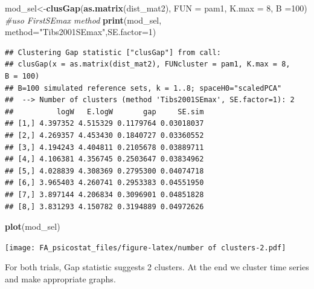 \documentclass[]{article}
\newenvironment{Shaded}{\begin{snugshade}}{\end{snugshade}}
\newcommand{\CommentTok}[1]{\textcolor[rgb]{0.56,0.35,0.01}{\textit{#1}}}
\newcommand{\DataTypeTok}[1]{\textcolor[rgb]{0.13,0.29,0.53}{#1}}
\newcommand{\DecValTok}[1]{\textcolor[rgb]{0.00,0.00,0.81}{#1}}
\newcommand{\KeywordTok}[1]{\textcolor[rgb]{0.13,0.29,0.53}{\textbf{#1}}}
\newcommand{\NormalTok}[1]{#1}
\newcommand{\OperatorTok}[1]{\textcolor[rgb]{0.81,0.36,0.00}{\textbf{#1}}}
\newcommand{\StringTok}[1]{\textcolor[rgb]{0.31,0.60,0.02}{#1}}
\begin{document}
\begin{Shaded}
\begin{Highlighting}[]
\NormalTok{mod_sel<-}\KeywordTok{clusGap}\NormalTok{(}\KeywordTok{as.matrix}\NormalTok{(dist_mat2), }\DataTypeTok{FUN =}\NormalTok{ pam1, }\DataTypeTok{K.max =} \DecValTok{8}\NormalTok{, }\DataTypeTok{B =}\DecValTok{100}\NormalTok{)}
\CommentTok{#uso FirstSEmax method}
\KeywordTok{print}\NormalTok{(mod_sel, }\DataTypeTok{method=}\StringTok{"Tibs2001SEmax"}\NormalTok{,}\DataTypeTok{SE.factor=}\DecValTok{1}\NormalTok{)}
\end{Highlighting}
\end{Shaded}

\begin{verbatim}
## Clustering Gap statistic ["clusGap"] from call:
## clusGap(x = as.matrix(dist_mat2), FUNcluster = pam1, K.max = 8,     B = 100)
## B=100 simulated reference sets, k = 1..8; spaceH0="scaledPCA"
##  --> Number of clusters (method 'Tibs2001SEmax', SE.factor=1): 2
##          logW   E.logW       gap     SE.sim
## [1,] 4.397352 4.515329 0.1179764 0.03018037
## [2,] 4.269357 4.453430 0.1840727 0.03360552
## [3,] 4.194243 4.404811 0.2105678 0.03889711
## [4,] 4.106381 4.356745 0.2503647 0.03834962
## [5,] 4.028839 4.308369 0.2795300 0.04074718
## [6,] 3.965403 4.260741 0.2953383 0.04551950
## [7,] 3.897144 4.206834 0.3096901 0.04851828
## [8,] 3.831293 4.150782 0.3194889 0.04972626
\end{verbatim}

\begin{Shaded}
\begin{Highlighting}[]
\KeywordTok{plot}\NormalTok{(mod_sel)}
\end{Highlighting}
\end{Shaded}

\texttt{[image: FA\_psicostat\_files/figure-latex/number of clusters-2.pdf]}

For both trials, Gap statistic suggests 2 clusters. At the end we
cluster time series and make appropriate graphs.

\begin{Shaded}
\end{Shaded}
\end{document}
